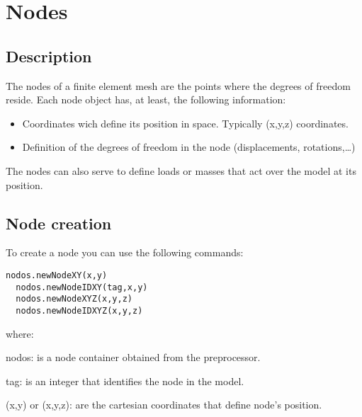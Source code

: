 \section{Nodes}

\subsection{Description}
The nodes of a finite element mesh are the points where the degrees of freedom reside. Each node object has, at least, the following information:

\begin{itemize}
\item Coordinates wich define its position in space. Typically (x,y,z) coordinates.
\item Definition of the degrees of freedom in the node (displacements, rotations,\ldots)
\end{itemize}

The nodes can also serve to define loads or masses that act over the model at its position.

\subsection{Node creation}

To create a node you can use the following commands:

\begin{lstlisting}[frame=single]
  nodos.newNodeXY(x,y)
  nodos.newNodeIDXY(tag,x,y)
  nodos.newNodeXYZ(x,y,z)
  nodos.newNodeIDXYZ(x,y,z)
\end{lstlisting}

\noindent where:

\begin{description}
\item{nodos:} is a node container obtained from the preprocessor.
\item{tag:} is an integer that identifies the node in the model.
\item{(x,y) or (x,y,z):} are the cartesian coordinates that define node's position.
\end{description}

